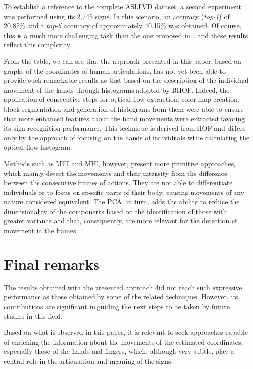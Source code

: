
To establish a reference to the complete ASLLVD dataset, a second experiment was performed using its 2,745 signs. In this scenario, an accuracy (\textit{top-1}) of 20.85\% and a \textit{top-5} accuracy of approximately 40.15\% was obtained. Of course, this is a much more challenging task than the one proposed in~\cite{lim-2016}, and these results reflect this complexity.

From the table, we can see that the approach presented in this paper, based on graphs of the coordinates of human articulations, has not yet been able to provide such remarkable results as that based on the description of the individual movement of the hands through histograms adopted by BHOF. Indeed, the application of consecutive steps for optical flow extraction, color map creation, block segmentation and generation of histograms from them were able to ensure that more enhanced features about the hand movements were extracted favoring its sign recognition performance. This technique is derived from HOF and differs only by the approach of focusing on the hands of individuals while calculating the optical flow histogram.

Methods such as MEI and MHI, however, present more primitive approaches, which mainly detect the movements and their intensity from the difference between the consecutive frames of actions. They are not able to differentiate individuals or to focus on specific parts of their body, causing movements of any nature considered equivalent. The PCA, in turn, adds the ability to reduce the dimensionality of the components based on the identification of those with greater variance and that, consequently, are more relevant for the detection of movement in the frames.

\section{Final remarks} 
\label{sec:final-remarks}

The results obtained with the presented approach did not reach such expressive performance as those obtained by some of the related techniques. However, its contributions are significant in guiding the next steps to be taken by future studies in this field.

Based on what is observed in this paper, it is relevant to seek approaches capable of enriching the information about the movements of the estimated coordinates, especially those of the hands and fingers, which, although very subtle, play a central role in the articulation and meaning of the signs.

